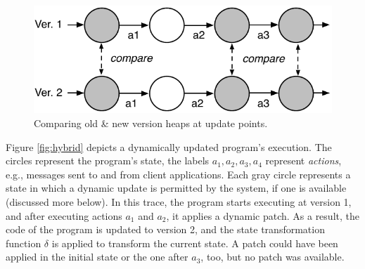 \documentclass[natbib]{sigplanconf}
\begin{document}
\begin{figure}
\begin{center}
\includegraphics[scale=0.55]{comparing-heaps-two-runs}
\end{center}
\caption{\label{fig:run-both}Comparing old \& new version heaps at update points.}
\end{figure}

Figure \ref{fig:hybrid} depicts a dynamically updated program's
execution.  The circles represent the program's state, the labels
$a_1, a_2, a_3, a_4$ represent \emph{actions}, e.g., messages sent to
and from client applications.  Each gray circle represents a state in
which a dynamic update is permitted by the system, if one is available
(discussed more below).  In this trace, the program starts executing
at version 1, and after executing actions $a_1$ and $a_2$, it applies
a dynamic patch.  As a result, the code of the program is updated to
version 2, and the state transformation function $\delta$ is applied
to transform the current state.  A patch could have been applied in
the initial state or the one after $a_3$, too, but no patch was
available.
\end{document}
